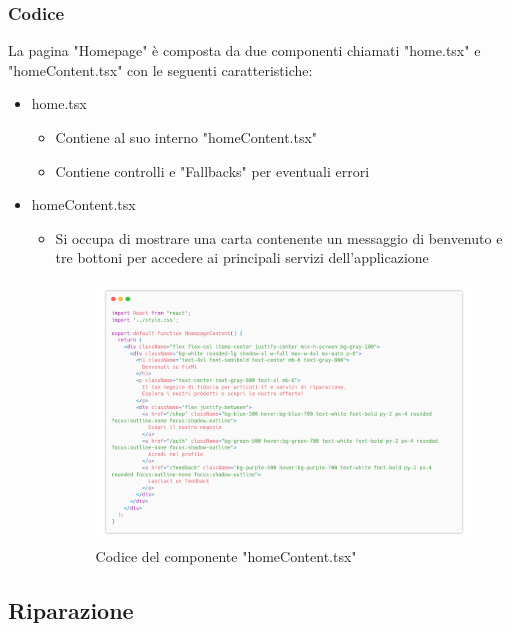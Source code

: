 \documentclass{report}
\begin{document}
\subsubsection*{Codice}
La pagina "Homepage" è composta da due componenti chiamati "home.tsx" e "homeContent.tsx" con le seguenti caratteristiche:
\begin{itemize}
	\item home.tsx
	\begin{itemize}
		\item Contiene al suo interno "homeContent.tsx"
		\item Contiene controlli e "Fallbacks" per eventuali errori
	\end{itemize}
	\item homeContent.tsx
	\begin{itemize}
		\item Si occupa di mostrare una carta contenente un messaggio di benvenuto e tre bottoni per accedere ai principali servizi dell'applicazione
		\begin{figure}[H]
			\centering\includegraphics[width=1\textwidth]{images/microservizio-home/frontend/homeContent-carbon.png}
			Codice del componente "homeContent.tsx"
		\end{figure}
	\end{itemize}
\end{itemize}

\subsection{Riparazione}
\end{document}
